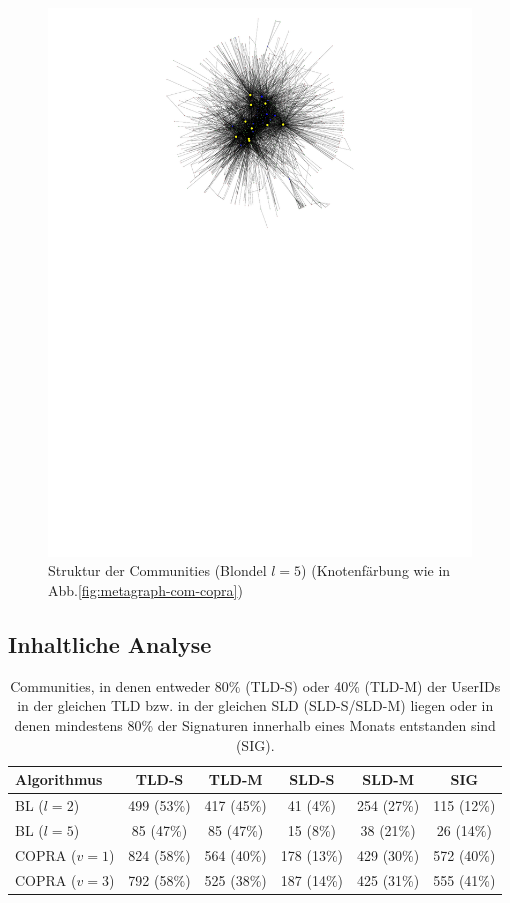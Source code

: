 \begin{figure}[h!]
  \centering
  \includegraphics[scale=1.6]{images/metagraph-blondel2-minsize4.pdf}
  \caption{Struktur der Communities (Blondel $l=5$) (Knotenfärbung
    wie in Abb.\ref{fig:metagraph-com-copra})}
  \label{fig:metagraph-com-blondel2}
\end{figure}

\subsection{Inhaltliche Analyse}
\label{sec:inhaltliche-analyse}

\begin{table}[t]
  \centering
  \footnotesize
  \begin{tabular}{l|c|c|c|c|c}
    Algorithmus & TLD-S & TLD-M & SLD-S & SLD-M & SIG \\
    \hline
    BL ($l=2$) & 499 (53\%) & 417 (45\%) & 41 (4\%) & 254 (27\%) & 115 (12\%) \\
    BL ($l=5$) & 85 (47\%) & 85 (47\%) & 15 (8\%) & 38 (21\%) & 26 (14\%) \\
    \hline
    COPRA ($v=1$) & 824 (58\%) & 564 (40\%) & 178 (13\%) & 429 (30\%)
    & 572 (40\%) \\
    COPRA ($v=3$) & 792 (58\%) & 525 (38\%) & 187 (14\%) & 425 (31\%) & 555
    (41\%)
  \end{tabular}
  \caption{Communities, in denen entweder 80\% (TLD-S) oder 40\%
    (TLD-M) der UserIDs in der gleichen TLD bzw. in der gleichen SLD
    (SLD-S/SLD-M) liegen oder in denen mindestens 80\% der Signaturen
    innerhalb eines Monats entstanden sind (SIG).}
  \label{tab:assign}
\end{table}

